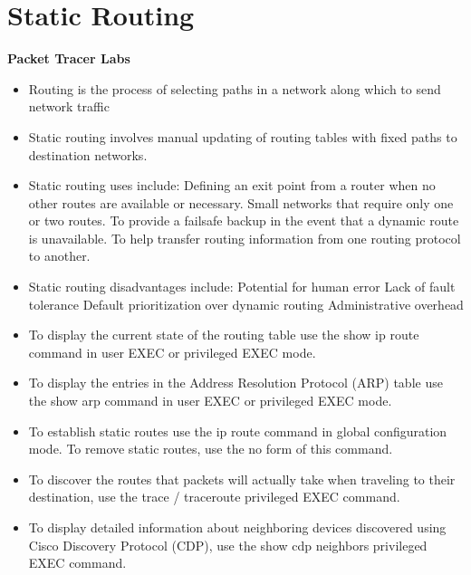 \documentclass[../EngineeringJournal_CDavis.tex]{subfiles}
\begin{document}

\chapter*{Static \linebreak[1] Routing \hspace*{\fill}{2020}}
\noindent\textbf{{Packet Tracer Labs} }                             



\hspace{0.2cm}
\begin{tcolorbox}[width=6.3in]
\scriptsize 
  \begin{itemize}
    \item{Routing} is the process of selecting paths in a network along which to send
      network traffic
    \item{Static routing} involves manual updating of routing tables with fixed paths to destination networks.
    \item{Static routing uses include:}
    \subitem{} Defining an exit point from a router when no other routes are available or necessary.
    \subitem{} Small networks that require only one or two routes.
    \subitem{}To provide a failsafe backup in the event that a dynamic route is unavailable.
    \subitem{}To help transfer routing information from one routing protocol to another.
  \item{Static routing disadvantages include:}
    \subitem{}Potential for human error
    \subitem{}Lack of fault tolerance
    \subitem{}Default prioritization over dynamic routing
    \subitem{}Administrative overhead
  \item{To display the current state of the routing table} use the show ip route command in user EXEC or privileged EXEC mode.
  \item{To display the entries in the Address Resolution Protocol (ARP) table} use the show arp command in user EXEC or privileged EXEC mode.
  \item{To establish static routes} use the ip route command in global configuration mode. To remove static routes, use the no form of this command.
  \item{To discover the routes that packets will actually take} when traveling to their destination, use the trace / traceroute privileged EXEC command.
  \item{To display detailed information about neighboring devices} discovered using Cisco Discovery Protocol (CDP), use the show cdp neighbors privileged EXEC command.
  \end{itemize}
\end{tcolorbox}
\hspace{0.2cm}
\normalsize  
\end{document}
